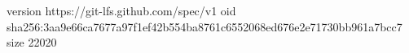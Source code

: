 version https://git-lfs.github.com/spec/v1
oid sha256:3aa9e66ca7677a97f1ef42b554ba8761c6552068ed676e2e71730bb961a7bcc7
size 22020
